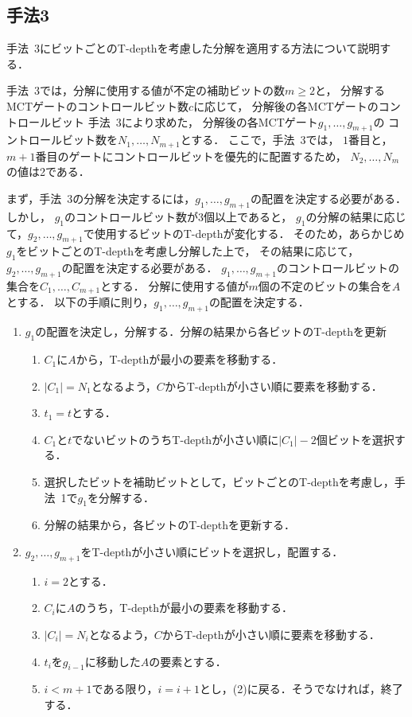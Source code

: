 \subsection{手法3}
手法~3にビットごとのT-depthを考慮した分解を適用する方法について説明する．
\par
手法~3では，分解に使用する値が不定の補助ビットの数$m\geq 2$と，
分解するMCTゲートのコントロールビット数$c$に応じて，
分解後の各MCTゲートのコントロールビット
手法~3により求めた，
分解後の各MCTゲート$g_{1},\dots, g_{m+1}$の
コントロールビット数を$N_{1},\dots, N_{m+1}$とする．
ここで，手法~3では，
$1$番目と，$m+1$番目のゲートにコントロールビットを優先的に配置するため，
$N_{2},\dots, N_{m}$の値は2である．
\par
まず，手法~3の分解を決定するには，$g_{1},\dots ,g_{m+1}$の配置を決定する必要がある．
しかし，
$g_{1}$のコントロールビット数が3個以上であると，
$g_{1}$の分解の結果に応じて，$g_{2},\dots, g_{m+1}$で使用するビットのT-depthが変化する．
そのため，あらかじめ$g_{1}$をビットごとのT-depthを考慮し分解した上で，
その結果に応じて，$g_{2},\dots, g_{m+1}$の配置を決定する必要がある．
$g_{1},\dots,g_{m+1}$のコントロールビットの集合を$C_{1},\dots, C_{m+1}$とする．
分解に使用する値が$m$個の不定のビットの集合を$A$とする．
以下の手順に則り，$g_{1},\dots ,g_{m+1}$の配置を決定する．
\begin{enumerate}[手順1]
  \item $g_{1}$の配置を決定し，分解する．分解の結果から各ビットのT-depthを更新
  \begin{enumerate}
    \item $C_{1}$に$A$から，T-depthが最小の要素を移動する．
    \item $|C_{1}|=N_{1}$となるよう，$C$からT-depthが小さい順に要素を移動する．
    \item $t_{1}=t$とする．
    \item $C_{1}$と$t$でないビットのうちT-depthが小さい順に$|C_{1}|-2$個ビットを選択する．
    \item 選択したビットを補助ビットとして，ビットごとのT-depthを考慮し，手法~1で$g_{1}$を分解する．
    \item 分解の結果から，各ビットのT-depthを更新する．
  \end{enumerate}
  \item $g_{2}, \dots ,g_{m+1}$をT-depthが小さい順にビットを選択し，配置する．
  \begin{enumerate}[(1)]
    \item $i=2$とする．
    \item $C_{i}$に$A$のうち，T-depthが最小の要素を移動する．
    \item $|C_{i}|=N_{i}$となるよう，$C$からT-depthが小さい順に要素を移動する．
    \item $t_{i}$を$g_{i-1}$に移動した$A$の要素とする．
    \item $i < m+1$である限り，$i=i+1$とし，(2)に戻る．そうでなければ，終了する．
  \end{enumerate}
 \end{enumerate}
